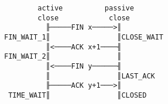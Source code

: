 \documentclass[varwidth,crop]{standalone}
\begin{document}
\begin{verbatim}
        active          passive
        close            close
          ╟─────FIN x─────>║
FIN_WAIT_1║                ║CLOSE_WAIT 
          ║<────ACK x+1────╢
FIN_WAIT_2║                ║
          ║<────FIN y──────╢
          ║                ║LAST_ACK 
          ╟─────ACK y+1───>║
 TIME_WAIT║                ║CLOSED
\end{verbatim}
\end{document}
